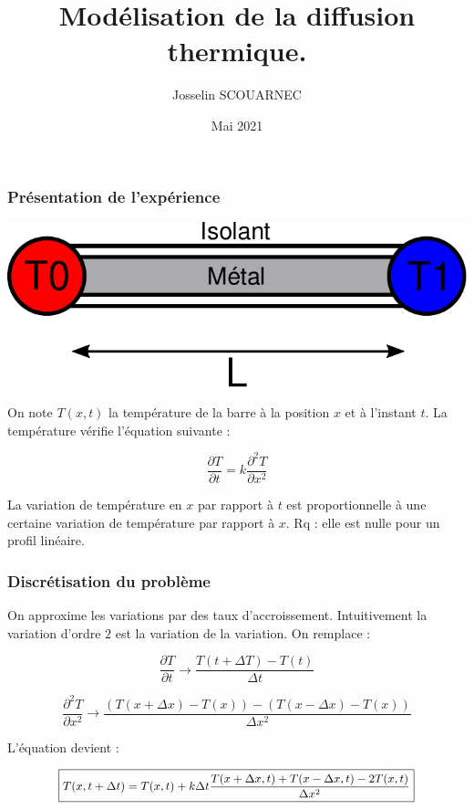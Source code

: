 \documentclass{beamer}
\title{Modélisation de la diffusion thermique.}
\author{Josselin SCOUARNEC}
\date{Mai 2021}
\begin{document}
    \maketitle


    \begin{frame}
    \frametitle{Présentation de l'expérience}

    \begin{center}
    \includegraphics[width=0.6\linewidth]{figs/schem.pdf}
    \end{center}

    On note $T(x, t)$ la température de la barre à la position $x$ et à l'instant $t$. La température vérifie l'équation suivante :

    $$\frac{\partial T}{\partial t } = k\frac{\partial^2 T}{\partial x^2 }$$

    La variation de température en $x$ par rapport à $t$ est proportionnelle à une certaine variation de température par rapport à $x$. Rq : elle est nulle pour un profil linéaire.



    \end{frame}

    \begin{frame}
    \frametitle{Discrétisation du problème}

    On approxime les variations par des taux d'accroissement. Intuitivement la variation d'ordre $2$ est la variation de la variation. On remplace :

    \medskip

    $$\frac{\partial T}{\partial t } \longrightarrow \frac{T(t + \Delta T) - T(t)}{\Delta t }$$


   	$$\frac{\partial^2 T}{\partial x^2} \longrightarrow \frac{(T(x + \Delta x)-T(x)) - (T(x-\Delta x) -T(x))}{\Delta x ^2 }$$

    \bigskip

    L'équation devient :

    $$\small\boxed{T(x, t + \Delta t) = T(x, t) + k \Delta t \frac{T(x+ \Delta x, t) + T(x-\Delta x, t) -2T(x, t)}{\Delta x ^2 }}$$


    \end{frame}
\end{document}
